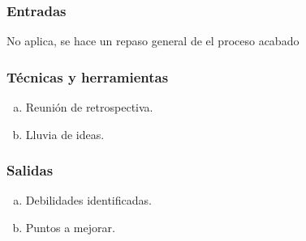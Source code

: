 \subsubsection*{Entradas}
No aplica, se hace un repaso general de el proceso acabado

\subsubsection*{Técnicas y herramientas}
\begin{enumerate}[a.]
  \item Reunión de retrospectiva.
  \item Lluvia de ideas.
\end{enumerate}

\subsubsection*{Salidas}
\begin{enumerate}[a.]
  \item Debilidades identificadas.
  \item Puntos a mejorar.
\end{enumerate}
